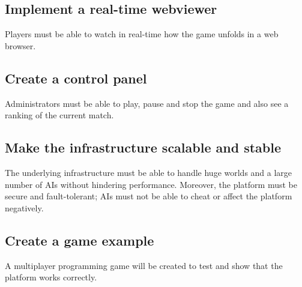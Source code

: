 \documentclass[a4paper,11pt,titlepage,abstract,numbers=noenddot,automark,mnsy,intlimits,rgb,dvipsnames]{report}
\begin{document}
\subsection{Implement a real-time webviewer}
\label{real_time_viewer}
Players must be able to watch in real-time how the game unfolds in a web browser.
\subsection{Create a control panel}
\label{control_panel_obj}
Administrators must be able to play, pause and stop the game and also see a ranking of the current match.
\subsection{Make the infrastructure scalable and stable}
\label{it_scalable_stable}
The underlying infrastructure must be able to handle huge worlds and a large number of \texttt{}AI\texttt{}s without
hindering performance. Moreover, the platform must be secure and fault-tolerant; AIs must not be able to cheat
or affect the platform negatively.
\subsection{Create a game example}
\label{game_example}
A multiplayer programming game will be created to test and show that the platform works correctly.
\clearpage
\end{document}
